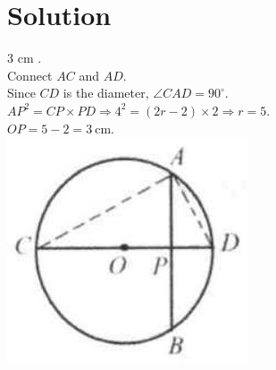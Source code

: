 \documentclass{article}
\begin{document}
\section*{Solution}
3 cm .\\
Connect \(A C\) and \(A D\).\\
Since \(C D\) is the diameter, \(\angle C A D=90^{\circ}\).\\
\(A P^{2}=C P \times P D \Rightarrow 4^{2}=(2 r-2) \times 2 \Rightarrow r=5\).\\
\(O P=5-2=3 \mathrm{~cm}\).\\
\centering
\includegraphics[width=\textwidth]{images/reasoning_image_1.jpg}
\end{document}

